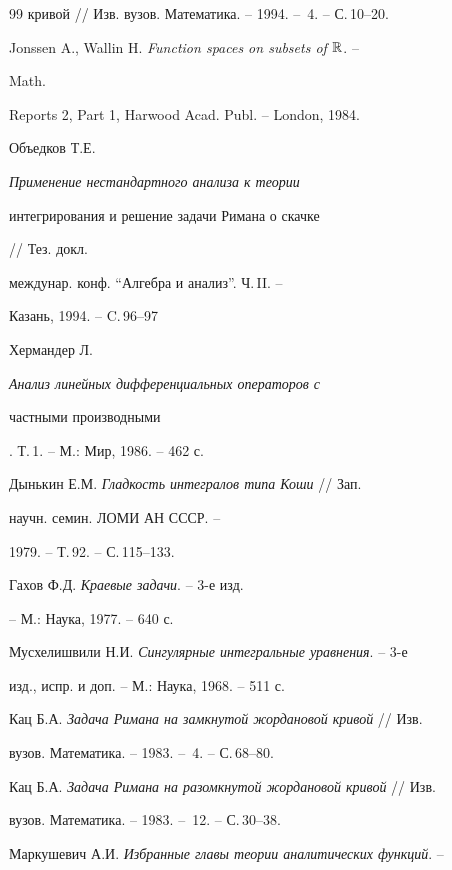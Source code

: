\begin{thebibliography}{99}
{кривой} // Изв. вузов. Математика. -- 1994. -- \No\,4. -- С.\,10--20. 




Jonssen A., Wallin H. {\em Function spaces on subsets of $\Bbb R$}. -- 


Math. 


Reports 2, Part 1, Harwood Acad. Publ. -- London, 1984.




Объедков Т.Е. {\em Применение нестандартного анализа к теории  


интегрирования и решение задачи Римана о скачке} // Тез. докл.


междунар. конф. ``Алгебра и анализ''. Ч.\,II. --


Казань, 1994. -- C.\,96--97




Хермандер Л. {\em Анализ линейных дифференциальных операторов с  


частными производными}. Т.\,1. -- М.: Мир, 1986. -- 462 с. 




Дынькин Е.М. {\em Гладкость интегралов типа Коши} // Зап. 


научн. семин. ЛОМИ АН СССР. -- 


1979. -- Т.\,92. -- С.\,115--133. 




Гахов Ф.Д. {\em Краевые задачи}. -- 3-е изд. 


-- М.: Наука, 1977. -- 640 с. 




Мусхелишвили Н.И. {\em Сингулярные интегральные уравнения}. -- 3-е 


изд., испр. и доп. -- М.: Наука, 1968. -- 511 с. 




Кац Б.А. {\em Задача Римана на замкнутой жордановой кривой} // Изв. 


вузов. Математика. -- 1983. -- \No\,4. -- С.\,68--80. 




Кац Б.А. {\em Задача Римана на разомкнутой жордановой кривой} // Изв. 


вузов. Математика. -- 1983. -- \No\,12. -- С.\,30--38. 




Маркушевич А.И. {\em Избранные главы теории аналитических функций}. -- 



\end{thebibliography}
